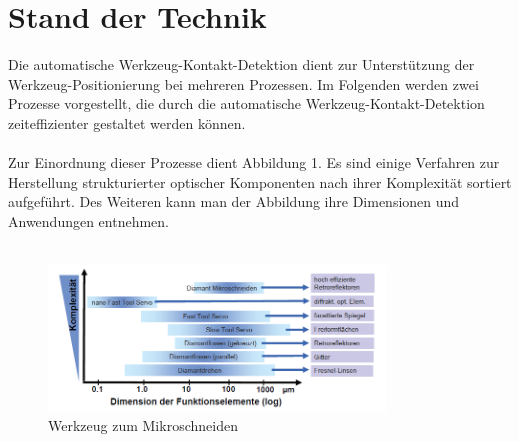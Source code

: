 \documentclass[12pt,a4paper,bibliography=totocnumbered,listof=totocnumbered]{scrartcl}
\begin{document}
\section{Stand der Technik}
Die automatische Werkzeug-Kontakt-Detektion dient zur Unterstützung der Werkzeug-Positionierung bei mehreren Prozessen. Im Folgenden werden zwei Prozesse vorgestellt, die durch die automatische Werkzeug-Kontakt-Detektion zeiteffizienter gestaltet werden können. \\ \\
Zur Einordnung dieser Prozesse dient Abbildung 1. Es sind einige Verfahren zur Herstellung strukturierter optischer Komponenten nach ihrer Komplexität sortiert aufgeführt. Des Weiteren kann man der Abbildung ihre Dimensionen und Anwendungen entnehmen. \\ \\ 
\begin{figure}[htbp]
\centering 
\includegraphics[width=0.8\textwidth]{Fertigungsverfahren.PNG}
\caption[Gla09]{Werkzeug zum Mikroschneiden}
\label{fig:Bild1}
\end{figure}
\break
\end{document}
